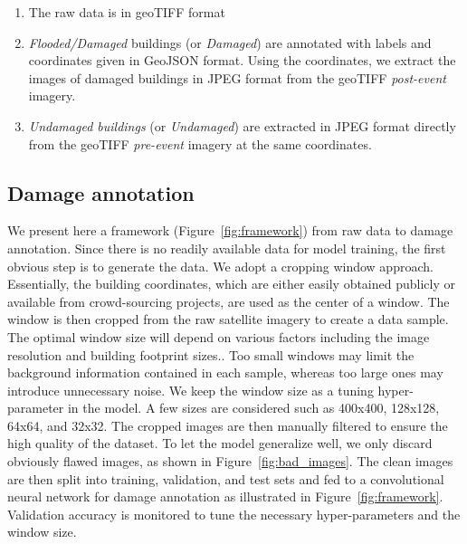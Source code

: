 \documentclass[journal, 12pt, onecolumn,draftclsnofoot]{IEEEtran}
\begin{document}
\begin{enumerate}
    \item The raw data is in geoTIFF format
    \item \textit{Flooded/Damaged} buildings (or \textit{Damaged}) are annotated with labels and coordinates given in GeoJSON format. Using the coordinates, we extract the images of damaged buildings in JPEG format from the geoTIFF \textit{post-event} imagery. 
    \item \textit{Undamaged buildings} (or \textit{Undamaged}) are extracted in JPEG format directly from the geoTIFF \textit{pre-event} imagery at the same coordinates.
\end{enumerate}

\subsection{Damage annotation}\label{sec:annotation}
We present here a framework (Figure~\ref{fig:framework}) from raw data to damage annotation. Since there is no readily available data for model training, the first obvious step is to generate the data. We adopt a cropping window approach. Essentially, the building coordinates, which are either easily obtained publicly or available from crowd-sourcing projects, are used as the center of a window. The window is then cropped from the raw satellite imagery to create a data sample. The optimal window size will depend on various factors including the image resolution and building footprint sizes.. Too small windows may limit the background information contained in each sample, whereas too large ones may introduce unnecessary noise. We keep the window size as a tuning hyper-parameter in the model. A few sizes are considered such as 400x400, 128x128, 64x64, and 32x32. The cropped images are then manually filtered to ensure the high quality of the dataset. To let the model generalize well, we only discard obviously flawed images, as shown in Figure~\ref{fig:bad_images}. The clean images are then split into training, validation, and test sets and fed to a convolutional neural network for damage annotation as illustrated in Figure~\ref{fig:framework}. Validation accuracy is monitored to tune the necessary hyper-parameters and the window size.
\end{document}
